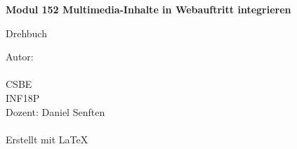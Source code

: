 
\begin{titlepage}
    \begin{center}
        \vspace*{2.5cm}

        \Huge
        \textbf{Modul 152 Multimedia-Inhalte in Webauftritt integrieren}

        \vspace{0.5cm}
        \LARGE
        Drehbuch

        \vfill


        \vspace{0.8cm}

        \Large
        Autor: \gitAuthorName\\
        \gitAuthorEmail\\
        CSBE\\
        INF18P\\
        Dozent: Daniel Senften\\
        \gitAuthorDate\\
        \small
        \vspace{1cm}
        Erstellt mit \LaTeX\\
        \vspace{1cm}
        \gitStyler
    \end{center}
\end{titlepage}